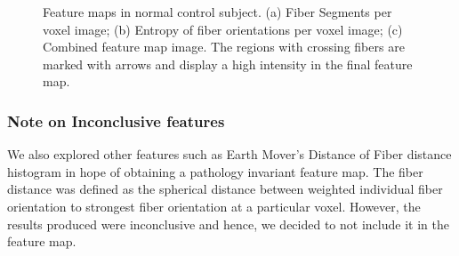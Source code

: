 \documentclass{llncs}
\begin{document}
\begin{figure}
    \centering
    \caption{Feature maps in normal control subject. (a) Fiber Segments per voxel image; (b) Entropy of fiber orientations per voxel image; (c) Combined feature map image. The regions with crossing fibers are marked with arrows and display a high intensity in the final feature map.}
    \label{fig:featureMap}
\end{figure}

%
\subsubsection{Note on Inconclusive features}
%
We also explored other features such as Earth Mover's Distance of Fiber distance histogram in hope of obtaining a pathology invariant feature map. The fiber distance was defined as the spherical distance between weighted individual fiber orientation to strongest fiber orientation at a particular voxel. However, the results produced were inconclusive and hence, we decided to not include it in the feature map.
\end{document}
